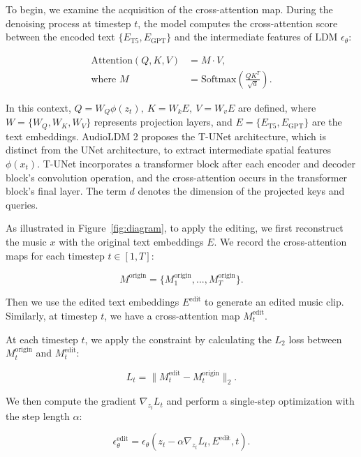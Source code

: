 To begin, we examine the acquisition of the cross-attention map. During the denoising process at timestep $t$, the model computes the cross-attention score between the encoded text $\{E_\text{T5}, E_\text{GPT}\}$ and the intermediate features of LDM $\epsilon_\theta$:

\begin{equation}
\begin{split}
\text{Attention}(Q, K, V) &= M \cdot V, \\
\text{where } M &= \text{Softmax}\left(\frac{QK^T}{\sqrt{d}}\right).
\end{split}
\end{equation}

In this context, $Q = W_Q\phi(z_t),~ K = W_kE,~ V = W_vE$ are defined, where $W = \{W_Q, W_K, W_V\}$ represents projection layers, and $E = \{E_\text{T5}, E_\text{GPT}\}$ are the text embeddings. AudioLDM 2 proposes the T-UNet architecture, which is distinct from the UNet architecture, to extract intermediate spatial features $\phi(x_t)$. T-UNet incorporates a transformer block after each encoder and decoder block's convolution operation, and the cross-attention occurs in the transformer block's final layer. The term $d$ denotes the dimension of the projected keys and queries.

As illustrated in Figure~\ref{fig:diagram}, to apply the editing, we first reconstruct the music $x$ with the original text embeddings $E$. We record the cross-attention maps for each timestep $t \in [1, T]$:

\begin{equation}
    M^\text{origin} = \{M^\text{origin}_1, ..., M^\text{origin}_T\}.
\end{equation}

\noindent Then we use the edited text embeddings $E^\text{edit}$ to generate an edited music clip. Similarly, at timestep $t$, we have a cross-attention map $M^\text{edit}_t$.

At each timestep $t$, we apply the constraint by calculating the $L_2$ loss between $M^\text{origin}_t$ and $M^\text{edit}_t$:

\begin{equation}
    L_t = \| M^\text{edit}_t - M^\text{origin}_t\|_2.
\end{equation}

\noindent We then compute the gradient $\nabla_{z_t}L_t$ and perform a single-step optimization with the step length $\alpha$:

\begin{equation}
    \epsilon^\text{edit}_\theta = \epsilon_\theta(z_t - \alpha\nabla_{z_t}L_t, E^\text{edit}, t).
\end{equation}

